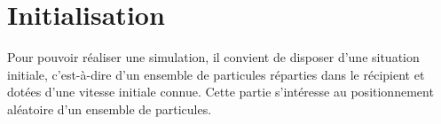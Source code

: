 \section{Initialisation}
Pour pouvoir réaliser une simulation, il convient de disposer d'une
situation initiale, c'est-à-dire d'un ensemble de particules réparties
dans le récipient et dotées d'une vitesse initiale connue. Cette
partie s'intéresse au positionnement aléatoire d'un ensemble de
particules.
